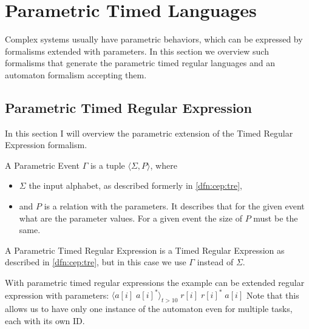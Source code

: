 	
	\section{Parametric Timed Languages}
	
			Complex systems usually have parametric behaviors, which can be expressed by formalisms extended with parameters. In this section we overview such formalisms that generate the parametric timed regular languages and an automaton formalism accepting them.
			
		\subsection{Parametric Timed Regular Expression}
		
		In this section I will overview the parametric extension of the Timed Regular Expression formalism.
			
			\begin{dfn}
				\label{dfn:cep:ptrea:event}
				A Parametric Event $\Gamma$ is a tuple $\langle \Sigma, P \rangle$, where 
				\begin{itemize}
					\item $\Sigma$ the input alphabet, as described formerly in \cref{dfn:cep:tre},
					\item and $P$ is a relation with the parameters. It describes that for the given event what are the parameter values. For a given event the size of $P$ must be the same.
				\end{itemize}
			\end{dfn}
			
	
			\begin{dfn}
			A Parametric Timed Regular Expression is a Timed Regular Expression as described in \cref{dfn:cep:tre}, but in this case we use $\Gamma$ instead of $\Sigma$.
			
			\end{dfn}
			
			With parametric timed regular expressions the example can be extended regular expression with parameters:
			$ \langle a[i] \; a[i]^\ast \rangle_{t > 10} \; r[i] \; r[i]^\ast \; a[i]$ %
			Note that this allows us to have only one instance of the automaton even for multiple tasks, each with its own ID.
		
